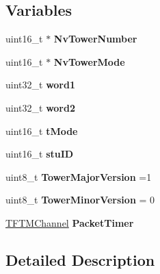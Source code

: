 \subsection*{Variables}
\begin{DoxyCompactItemize}
\item 
\hypertarget{group___main__module_ga157ffb641cfd48e3e33e64a66e0abffb}{}uint16\+\_\+t $\ast$ {\bfseries Nv\+Tower\+Number}\label{group___main__module_ga157ffb641cfd48e3e33e64a66e0abffb}

\item 
\hypertarget{group___main__module_gab1448321383edf5df615679633627eee}{}uint16\+\_\+t $\ast$ {\bfseries Nv\+Tower\+Mode}\label{group___main__module_gab1448321383edf5df615679633627eee}

\item 
\hypertarget{group___main__module_ga68605a4a1403840f43c32aa46193b722}{}uint32\+\_\+t {\bfseries word1}\label{group___main__module_ga68605a4a1403840f43c32aa46193b722}

\item 
\hypertarget{group___main__module_ga69b6572e5de4d7447a9c849c0c96a9f1}{}uint32\+\_\+t {\bfseries word2}\label{group___main__module_ga69b6572e5de4d7447a9c849c0c96a9f1}

\item 
\hypertarget{group___main__module_ga5e928767700565eb5f4cd6eaa6b417aa}{}uint16\+\_\+t {\bfseries t\+Mode}\label{group___main__module_ga5e928767700565eb5f4cd6eaa6b417aa}

\item 
\hypertarget{group___main__module_ga718626b7f70710449f5d6769fe3b614a}{}uint16\+\_\+t {\bfseries stu\+I\+D}\label{group___main__module_ga718626b7f70710449f5d6769fe3b614a}

\item 
\hypertarget{group___main__module_gafe2727f577d7f8ba644bfb9cee597569}{}uint8\+\_\+t {\bfseries Tower\+Major\+Version} =1\label{group___main__module_gafe2727f577d7f8ba644bfb9cee597569}

\item 
\hypertarget{group___main__module_ga84733850b7f1642d7a8cfb5c5eab4723}{}uint8\+\_\+t {\bfseries Tower\+Minor\+Version} = 0\label{group___main__module_ga84733850b7f1642d7a8cfb5c5eab4723}

\item 
\hyperlink{struct_t_f_t_m_channel}{T\+F\+T\+M\+Channel} {\bfseries Packet\+Timer}
\end{DoxyCompactItemize}


\subsection{Detailed Description}


